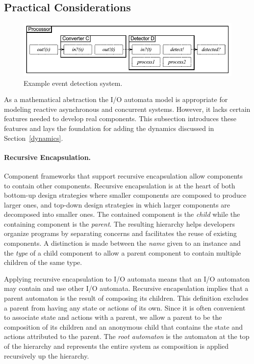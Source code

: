 \subsection{Practical Considerations\label{practical}}

\begin{figure}
\center
\includegraphics[width=\textwidth]{system_model}
\caption{Example event detection system.}
\label{sys_model}
\end{figure}

As a mathematical abstraction the I/O automata model is appropriate for modeling reactive asynchronous and concurrent systems.
However, it lacks certain features needed to develop real components.
This subsection introduces these features and lays the foundation for adding the dynamics discussed in Section~\ref{dynamics}.

\paragraph{Recursive Encapsulation.}
Component frameworks that support recursive encapsulation allow components to contain other components.
Recursive encapsulation is at the heart of both bottom-up design strategies where smaller components are composed to produce larger ones, and top-down design strategies in which larger components are decomposed into smaller ones.
The contained component is the \emph{child} while the containing component is the \emph{parent}.
The resulting hierarchy helps developers organize programs by separating concerns and facilitates the reuse of existing components.
A distinction is made between the \emph{name} given to an instance and the \emph{type} of a child component to allow a parent component to contain multiple children of the same type.

Applying recursive encapsulation to I/O automata means that an I/O automaton may contain and use other I/O automata.
Recursive encapsulation implies that a parent automaton is the result of composing its children.
This definition excludes a parent from having any state or actions of its own.
Since it is often convenient to associate state and actions with a parent, we allow a parent to be the composition of its children and an anonymous child that contains the state and actions attributed to the parent.
The \emph{root automaton} is the automaton at the top of the hierarchy and represents the entire system as composition is applied recursively up the hierarchy.

